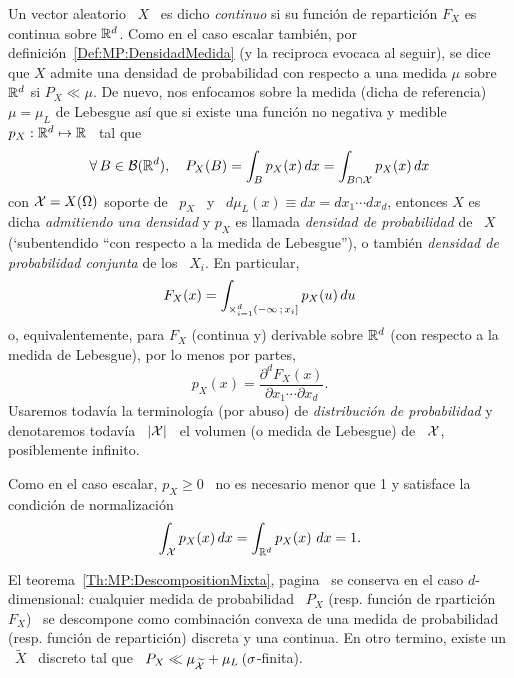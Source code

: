 \begin{definicion}
  Un  vector aleatorio  \  $X$ \  es dicho  {\it  continuo} si  su funci\'on  de
  repartici\'on  $F_X$ es  continua sobre  $\mathbb{R}^d$.  Como  en el  caso escalar
  tambi\'en,   por  definici\'on~\ref{Def:MP:DensidadMedida}  (y   la  reciproca
  evocaca al  seguir), se dice que  $X$ admite una densidad  de probabilidad con
  respecto a  una medida $\mu$ sobre $\mathbb{R}^d$  si $P_X \ll \mu$.   De nuevo, nos
  enfocamos  sobre la medida  (dicha de  referencia) $\mu  = \mu_L$  de Lebesgue
  as\'i  que si  existe una  funci\'on  no negativa  y medible  \ $p_X:  \mathbb{R}^d
  \mapsto \mathbb{R}$ \ tal que
  \[
  \forall \,  B \in \mathcal{B}(\mathbb{R}^d),  \quad P_X(B) =  \int_B p_X(x) \, dx  = \int_{B
    \cap \mathcal{X}} p_X(x) \, dx
  \]
  con $\mathcal{X}  = X(\Omega)$ soporte  de \ $p_X$  \ y \  $d\mu_L(x) \equiv dx  = dx_1
  \cdots dx_d$, entonces  $X$ es dicha {\it admitiendo una  densidad} y $p_X$ es
  llamada {\it densidad de probabilidad} de \ $X$ (`subentendido ``con respecto a
  la medida de Lebesgue''), o  tambi\'en {\it densidad de probabilidad conjunta}
  de los \ $X_i$. En particular,
  \[
  F_X(x) =  \int_{\operatorname*{\times}_{i=1}^d (-\infty \, ;  \, x_i]} p_X(u) \, du
  \]
  o, equivalentemente,  para $F_X$ (continua  y) derivable sobre  $\mathbb{R}^d$ (con
  respecto a la medida de Lebesgue), por lo menos por partes,
  \[
  p_X(x) = \frac{\partial^d F_X(x)}{\partial x_1 \cdots \partial x_d}.
  \]
  Usaremos  todav\'ia la terminolog\'ia  (por abuso)  de {\it  distribuci\'on de
    probabilidad} y  denotaremos todav\'ia  \ $|\mathcal{X}|$ \  el volumen (o  medida de
  Lebesgue) de \ $\mathcal{X}$, posiblemente infinito.
\end{definicion}

Como en el caso  escalar, $p_X \ge 0$ \ no es necesario  menor que 1 y satisface
la condici\'on de normalizaci\'on
%
\[
\int_{\mathcal{X}} p_X(x) \, dx = \int_{\mathbb{R}^d} p_X(x) \ dx  = 1.
\]

El                                       teorema~\ref{Th:MP:DescompositionMixta},
pagina~\pageref{Th:MP:DescompositionMixta}    se    conserva    en    el    caso
$d$-dimensional: cualquier  medida de probabilidad  \ $P_X$ (resp.  funci\'on de
rpartici\'on \ $F_X$)  \ se descompone como combinaci\'on  convexa de una medida
de probabilidad (resp.  funci\'on de repartici\'on) discreta y  una continua. En
otro  termino,  existe un  \  $\widetilde{X}$  \ discreto  tal  que  \ $P_X  \ll
\mu_{\widetilde{\mathcal{X}}} + \mu_L \: (\sigma$-finita).

